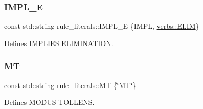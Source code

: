 \subsubsection{\texorpdfstring{I\+M\+P\+L\+\_\+E}{IMPL\_E}}
{\footnotesize\ttfamily const std\+::string rule\+\_\+literals\+::\+I\+M\+P\+L\+\_\+E \{I\+M\+PL, \mbox{\hyperlink{namespaceverbs_ae28355cc9321ebee9abcd23bb6e1b836}{verbs\+::\+E\+L\+IM}}\}}



Defines I\+M\+P\+L\+I\+ES E\+L\+I\+M\+I\+N\+A\+T\+I\+ON. 

\mbox{\label{namespacerule__literals_a056c3d0c0b701c07f444b7c5adfa8ff4}} 
\subsubsection{\texorpdfstring{MT}{MT}}
{\footnotesize\ttfamily const std\+::string rule\+\_\+literals\+::\+MT \{\char`\"{}MT\char`\"{}\}}



Defines M\+O\+D\+US T\+O\+L\+L\+E\+NS. 

